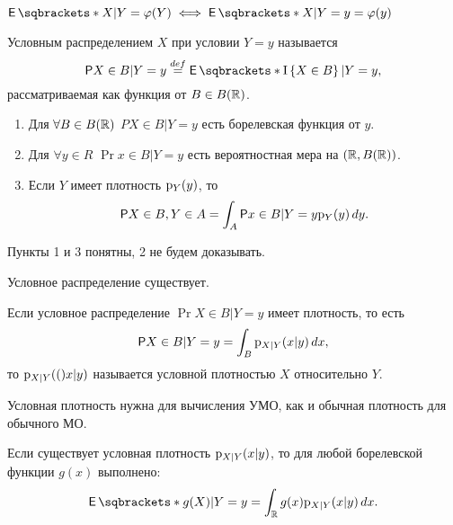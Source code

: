 \begin{remark}
    \(\E{X | Y} = \phi(Y) \iff \E{X | Y = y} = \phi(y)\)
\end{remark}

\begin{definition}
    Условным распределением \(X\) при условии \(Y = y\) называется
    \begin{displaymath}
        \Pr{X \in B | Y = y} \overset{def}= \E{\I{X \in B} | Y = y},
    \end{displaymath}
    рассматриваемая как функция от \(B \in B(\mathbb{R})\).
\end{definition}

\begin{enumerate}
    \item Для \(\forall B \in B(\mathbb{R})\) \(P{X \in B | Y = y}\) есть борелевская функция от \(y\).
    \item Для \(\forall y \in R\) \(\Pr{x \in B | Y = y}\) есть вероятностная мера на \((\mathbb{R}, B(\mathbb{R}))\).
    \item Если \(Y\) имеет плотность \(\mathrm{p}_{Y}{\left(y\right)}\), то
        \begin{displaymath}
            \mathsf{P}{X \in B, Y \in A} = \int_{A} \mathsf{P}{x \in B | Y = y} \mathrm{p}_{Y}{\left(y\right)} \mathop{}\!d y.
        \end{displaymath}
\end{enumerate}

Пункты 1 и 3 понятны, 2 не будем доказывать.

\begin{theorem}
    Условное распределение существует.
\end{theorem}

\begin{definition}
    Если условное распределение \(\Pr{X \in B | Y = y}\) имеет плотность, то есть
    \begin{displaymath}
        \mathsf{P}{X \in B | Y = y} = \int_{B} \mathrm{p}_{X | Y}{\left(x | y\right)} \mathop{}\!d x,
    \end{displaymath}
    то \(\mathrm{p}_{X | Y}{\left((\right)}x | y)\) называется условной плотностью \(X\) относительно \(Y\).
\end{definition}

\begin{remark}
    Условная плотность нужна для вычисления УМО, как и обычная плотность для обычного МО.
\end{remark}

\begin{theorem}
    Если существует условная плотность \(\mathrm{p}_{X | Y}{\left(x | y\right)}\), то для любой борелевской функции \(g(x)\) выполнено:
    \begin{displaymath}
        \E{g(X) | Y = y} = \int_\R g(x) \p{X | Y}{x | y} \diff x.
    \end{displaymath}
\end{theorem}

